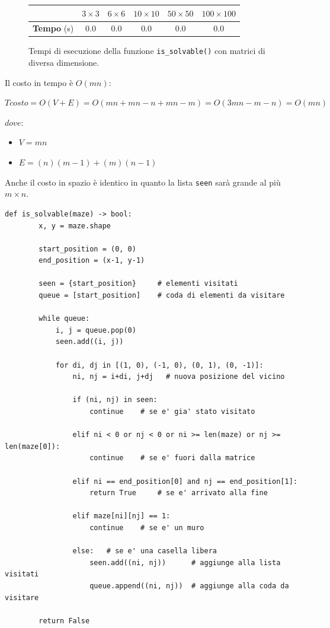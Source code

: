 \begin{figure}[H]
	\centering
   	\begin{tabular}{c | c | c | c | c | c}
		 & $3 \times 3$ & $6 \times 6$ & $10 \times 10$ & $50 \times 50$ & $100 \times 100$\\
		\hline
		\textbf{Tempo} (s) & 0.0 & 0.0 & 0.0 & 0.0 & 0.0\\ [2em]
	\end{tabular}
	\caption{Tempi di esecuzione della funzione \lstinline[style=cmd]|is_solvable()| con matrici di diversa dimensione.}
\end{figure}

Il costo in tempo \`{e} $O(mn)$:

\begin{center}
	$Tcosto = O(V + E) = O(mn + mn - n + mn - m) = O(3mn - m - n) = O(mn) $
\end{center}
$dove: $
\begin{itemize}
	\item $V = mn$
	\item $E = (n)(m-1) + (m)(n-1)$
\end{itemize}

Anche il costo in spazio \`{e} identico in quanto la lista \lstinline[style=cmd]|seen| sar\`{a} grande al pi\`{u} $m \times n$.

\begin{lstlisting}[style=python, caption={Funzione per controllare la risolvibilit\`{a} dei labirinti}]
	def is_solvable(maze) -> bool:
		x, y = maze.shape
		
		start_position = (0, 0)
		end_position = (x-1, y-1)

		seen = {start_position}     # elementi visitati
		queue = [start_position]    # coda di elementi da visitare
	
		while queue:
			i, j = queue.pop(0)
			seen.add((i, j))
	
			for di, dj in [(1, 0), (-1, 0), (0, 1), (0, -1)]:
				ni, nj = i+di, j+dj   # nuova posizione del vicino
				
				if (ni, nj) in seen:
					continue	# se e' gia' stato visitato
	
				elif ni < 0 or nj < 0 or ni >= len(maze) or nj >= len(maze[0]):
					continue	# se e' fuori dalla matrice
	
				elif ni == end_position[0] and nj == end_position[1]:
					return True		# se e' arrivato alla fine
	
				elif maze[ni][nj] == 1:
					continue	# se e' un muro
	
				else: 	# se e' una casella libera
					seen.add((ni, nj))      # aggiunge alla lista visitati
					queue.append((ni, nj))  # aggiunge alla coda da visitare
	
		return False
\end{lstlisting}
\pagebreak

